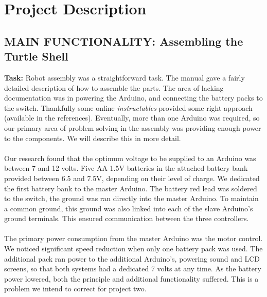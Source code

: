 \documentclass[paper=a4, fontsize=11pt]{scrartcl}
\numberwithin{equation}{section}		%
\numberwithin{figure}{section}			%
\numberwithin{table}{section}				%
\begin{document}
\section{Project Description}

\subsection{MAIN FUNCTIONALITY: Assembling the Turtle Shell}
{\textbf{Task: }Robot assembly was a straightforward task. The manual gave a fairly detailed description of how to assemble the parts. The area of lacking documentation was in powering the Arduino, and connecting the battery packs to the switch. Thankfully some online \textit{instructables} provided some right approach (available in the references). Eventually, more than one Arduino was required, so our primary area of problem solving in the assembly was providing enough power to the components. We will describe this in more detail.
\\\\
Our research found that the optimum voltage to be supplied to an Arduino was between 7 and 12 volts. Five AA 1.5V batteries in the attached battery bank provided between 6.5 and 7.5V, depending on their level of charge. We dedicated the first battery bank to the master Arduino. The battery red lead was soldered to the switch, the ground was ran directly into the master Arduino. To maintain a common ground, this ground was also linked into each of the slave Arduino's ground terminals. This ensured communication between the three controllers.
\\\\
The primary power consumption from the master Arduino was the motor control. We noticed significant speed reduction when only one battery pack was used. The additional pack ran power to the additional Arduino's, powering sound and LCD screens, so that both systems had a dedicated 7 volts at any time. As the battery power lowered, both the principle and additional functionality suffered. This is a problem we intend to correct for project two.

}
\end{document}
